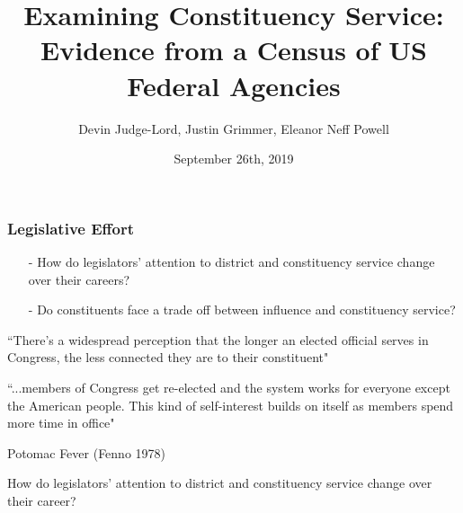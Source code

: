 \documentclass[xcolor=dvipsnames]{beamer}
\title[Examining Constituency Service]{\Large Examining Constituency Service: Evidence from a Census of US Federal Agencies}
\author[Judge-Lord, Grimmer, Powell]{\large Devin Judge-Lord, Justin Grimmer, Eleanor Neff Powell}
\institute[]{\normalsize University of Wisconsin,  Stanford University, University of Wisconsin}
\date{September 26th, 2019}
\begin{document}
\frame{\titlepage}


\begin{frame}
\frametitle{Legislative Effort}

\large

\begin{itemize}
\item[-] How do legislators' attention to district and constituency service change over their careers?  
\item[-] Do constituents face a trade off between influence and constituency service?
\end{itemize} 



\end{frame}



\begin{frame}



``There's a widespread perception that the longer an elected official serves in Congress, the less connected they are to their constituent"


\end{frame}


\begin{frame}



``...members of Congress get re-elected and the system works for everyone except the American people.  This kind of self-interest builds on itself as members spend more time in office"


\end{frame}


\begin{frame}



Potomac Fever (Fenno 1978) 

\end{frame}


\begin{frame}

\Large 

How do legislators' attention to district and constituency service change over their career?  \pause 

\begin{itemize}
	 \pause 
\end{itemize}

\end{frame}
\end{document}
